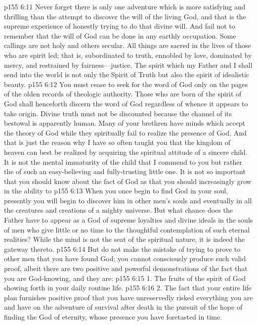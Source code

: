 \vs p155 6:11 \textcolor{ubdarkred}{Never forget there is only one adventure which is more satisfying and thrilling than the attempt to discover the will of the living God, and that is the supreme experience of honestly trying to do that divine will. And fail not to remember that the will of God can be done in any earthly occupation. Some callings are not holy and others secular. All things are sacred in the lives of those who are spirit led; that is, subordinated to truth, ennobled by love, dominated by mercy, and restrained by fairness---justice. The spirit which my Father and I shall send into the world is not only the Spirit of Truth but also the spirit of idealistic beauty.}
\vs p155 6:12 \textcolor{ubdarkred}{You must cease to seek for the word of God only on the pages of the olden records of theologic authority. Those who are born of the spirit of God shall henceforth discern the word of God regardless of whence it appears to take origin. Divine truth must not be discounted because the channel of its bestowal is apparently human. Many of your brethren have minds which accept the theory of God while they spiritually fail to realize the presence of God. And that is just the reason why I have so often taught you that the kingdom of heaven can best be realized by acquiring the spiritual attitude of a sincere child. It is not the mental immaturity of the child that I commend to you but rather the  of such an easy\hyp{}believing and fully\hyp{}trusting little one. It is not so important that you should know about the fact of God as that you should increasingly grow in the ability to }
\vs p155 6:13 \textcolor{ubdarkred}{When you once begin to find God in your soul, presently you will begin to discover him in other men’s souls and eventually in all the creatures and creations of a mighty universe. But what chance does the Father have to appear as a God of supreme loyalties and divine ideals in the souls of men who give little or no time to the thoughtful contemplation of such eternal realities? While the mind is not the seat of the spiritual nature, it is indeed the gateway thereto.}
\vs p155 6:14 \textcolor{ubdarkred}{But do not make the mistake of trying to prove to other men that you have found God; you cannot consciously produce such valid proof, albeit there are two positive and powerful demonstrations of the fact that you are God\hyp{}knowing, and they are:}
\vs p155 6:15 \textcolor{ubdarkred}{1. The fruits of the spirit of God showing forth in your daily routine life.}
\pc \vs p155 6:16 \textcolor{ubdarkred}{2. The fact that your entire life plan furnishes positive proof that you have unreservedly risked everything you are and have on the adventure of survival after death in the pursuit of the hope of finding the God of eternity, whose presence you have foretasted in time.}
